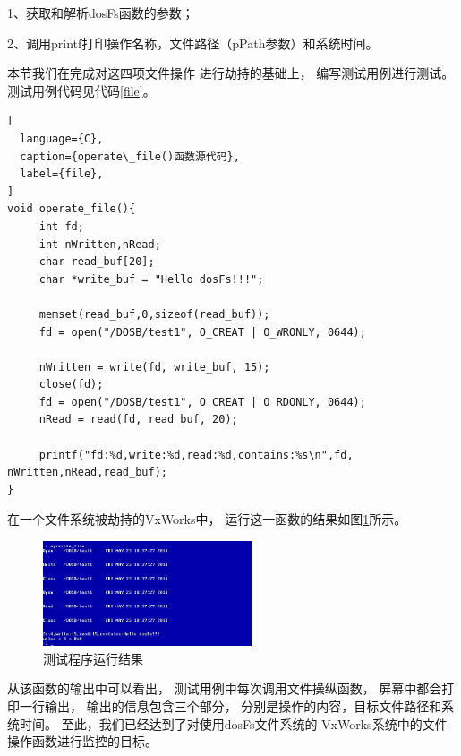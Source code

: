 1、获取和解析dosFs函数的参数；

2、调用printf打印操作名称，文件路径（pPath参数）和系统时间。

本节我们在完成对这四项文件操作
进行劫持的基础上，
编写测试用例进行测试。测试用例代码见代码\ref{file}。

\begin{lstlisting}[
  language={C},
  caption={operate\_file()函数源代码},
  label={file},
]
void operate_file(){
     int fd; 
     int nWritten,nRead;
     char read_buf[20]; 
     char *write_buf = "Hello dosFs!!!";

     memset(read_buf,0,sizeof(read_buf));
     fd = open("/DOSB/test1", O_CREAT | O_WRONLY, 0644);

     nWritten = write(fd, write_buf, 15);
     close(fd);
     fd = open("/DOSB/test1", O_CREAT | O_RDONLY, 0644);
     nRead = read(fd, read_buf, 20);

     printf("fd:%d,write:%d,read:%d,contains:%s\n",fd, nWritten,nRead,read_buf);
}
\end{lstlisting}


在一个文件系统被劫持的VxWorks中，
运行这一函数的结果如图\ref{after}所示。

\begin{figure}[h!]
    \centering
    \includegraphics[width=0.55\textwidth]{figure/after.jpg}
    \caption{测试程序运行结果}
    \label{after}
\end{figure}

从该函数的输出中可以看出，
测试用例中每次调用文件操纵函数，
屏幕中都会打印一行输出，
输出的信息包含三个部分，
分别是操作的内容，目标文件路径和系统时间。
至此，我们已经达到了对使用dosFs文件系统的
VxWorks系统中的文件操作函数进行监控的目标。











